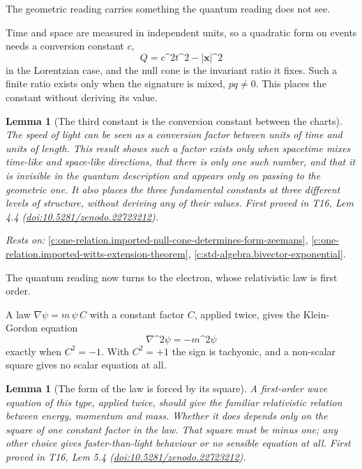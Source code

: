 \documentclass[11pt]{article}
\newtheorem{lemma}[theorem]{Lemma}
\theoremstyle{definition}
\theoremstyle{plain}
\begin{document}
The geometric reading carries something the quantum reading does not see.

Time and space are measured in independent units, so a quadratic form on events needs a conversion constant $c$, \[ Q = c\^{}{2}t\^{}{2} - |\mathbf{x}|\^{}{2} \] in the Lorentzian case, and the null cone is the invariant ratio it fixes. Such a finite ratio exists only when the signature is mixed, $pq \neq 0$. This places the constant without deriving its value.

\begin{lemma}[The third constant is the conversion constant between the charts]\label{c:one-relation.third-constant-conversion-constant-between-charts}
The speed of light can be seen as a conversion factor between units of time and units of length. This result shows such a factor exists only when spacetime mixes time-like and space-like directions, that there is only one such number, and that it is invisible in the quantum description and appears only on passing to the geometric one. It also places the three fundamental constants at three different levels of structure, without deriving any of their values.
\emph{First proved in} T16, Lem 4.4 (\href{https://doi.org/10.5281/zenodo.22723212}{doi:10.5281/zenodo.22723212}).
\end{lemma}
\noindent\emph{Rests on:} \ref{c:one-relation.imported-null-cone-determines-form-zeemans}, \ref{c:one-relation.imported-witts-extension-theorem}, \ref{c:std-algebra.bivector-exponential}.

The quantum reading now turns to the electron, whose relativistic law is first order.

A law $\nabla\psi = m\,\psi\,C$ with a constant factor $C$, applied twice, gives the Klein-Gordon equation \[ \nabla\^{}{2}\psi = -m\^{}{2}\psi \] exactly when $C^{2} = -1$. With $C^{2} = +1$ the sign is tachyonic, and a non-scalar square gives no scalar equation at all.

\begin{lemma}[The form of the law is forced by its square]\label{c:one-relation.form-law-forced-square}
A first-order wave equation of this type, applied twice, should give the familiar relativistic relation between energy, momentum and mass. Whether it does depends only on the square of one constant factor in the law. That square must be minus one; any other choice gives faster-than-light behaviour or no sensible equation at all.
\emph{First proved in} T16, Lem 5.4 (\href{https://doi.org/10.5281/zenodo.22723212}{doi:10.5281/zenodo.22723212}).
\end{lemma}
\end{document}
